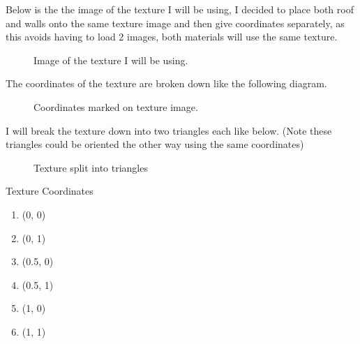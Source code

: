 \documentclass[10pt]{report}
\begin{document}
Below is the the image of the texture I will be using, I decided to place both roof and walls onto the same texture image and then give coordinates separately, as this avoids having to load 2 images, both materials will use the same texture.

\begin{figure}[H]
    \centering
    \caption{Image of the texture I will be using.}
\end{figure}

The coordinates of the texture are broken down like the following diagram.
\begin{figure}[H]
    \centering
    \caption{Coordinates marked on texture image.}
\end{figure}

I will break the texture down into two triangles each like below. (Note these triangles could be oriented the other way using the same coordinates)
\begin{figure}[H]
    \centering
    \caption{Texture split into triangles}
\end{figure}


Texture Coordinates
\begin{enumerate}[(1)]
    \item (0, 0)
    \item (0, 1)
    \item (0.5, 0)
    \item (0.5, 1)
    \item (1, 0)
    \item (1, 1)
\end{enumerate}
\end{document}
